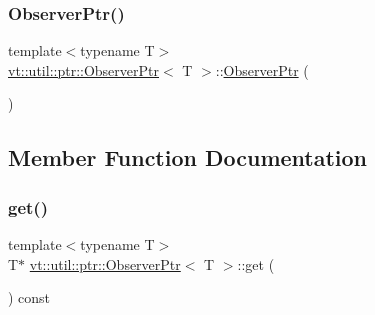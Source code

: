\subsubsection{\texorpdfstring{Observer\+Ptr()}{ObserverPtr()}\hspace{0.1cm}{\footnotesize\ttfamily [5/5]}}
{\footnotesize\ttfamily template$<$typename T$>$ \\
\hyperlink{structvt_1_1util_1_1ptr_1_1_observer_ptr}{vt\+::util\+::ptr\+::\+Observer\+Ptr}$<$ T $>$\+::\hyperlink{structvt_1_1util_1_1ptr_1_1_observer_ptr}{Observer\+Ptr} (\begin{DoxyParamCaption}\item[{\hyperlink{structvt_1_1util_1_1ptr_1_1_observer_ptr}{Observer\+Ptr}$<$ T $>$ \&\&}]{ }\end{DoxyParamCaption})\hspace{0.3cm}{\ttfamily [default]}}



\subsection{Member Function Documentation}
\mbox{\label{structvt_1_1util_1_1ptr_1_1_observer_ptr_a727d1e47b06c7603c40a6225866f0754}} 
\subsubsection{\texorpdfstring{get()}{get()}}
{\footnotesize\ttfamily template$<$typename T$>$ \\
T$\ast$ \hyperlink{structvt_1_1util_1_1ptr_1_1_observer_ptr}{vt\+::util\+::ptr\+::\+Observer\+Ptr}$<$ T $>$\+::get (\begin{DoxyParamCaption}{ }\end{DoxyParamCaption}) const\hspace{0.3cm}{\ttfamily [inline]}}

\mbox{\label{structvt_1_1util_1_1ptr_1_1_observer_ptr_a61aa176c133afa161529a374f0ca0832}} 
